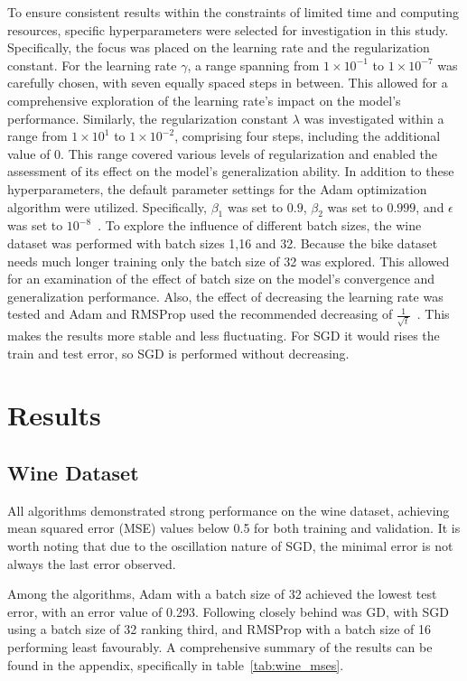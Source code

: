 \documentclass[10pt,conference,compsocconf]{IEEEtran}
\begin{document}
To ensure consistent results within the constraints of limited time and computing resources, specific hyperparameters were selected for investigation in this study. Specifically, the focus was placed on the learning rate and the regularization constant.
For the learning rate $\gamma$, a range spanning from $1 \times 10^{-1}$ to $1 \times 10^{-7}$ was carefully chosen, with seven equally spaced steps in between. This allowed for a comprehensive exploration of the learning rate's impact on the model's performance.
Similarly, the regularization constant $\lambda$ was investigated within a range from $1 \times 10^{1}$ to $1 \times 10^{-2}$, comprising four steps, including the additional value of $0$. This range covered various levels of regularization and enabled the assessment of its effect on the model's generalization ability.
In addition to these hyperparameters, the default parameter settings for the Adam optimization algorithm were utilized. Specifically, $\beta_1$ was set to $0.9$, $\beta_2$ was set to $0.999$, and $\epsilon$ was set to $10^{-8}$~\cite{kingma2017adam}.
To explore the influence of different batch sizes, the wine dataset was performed with batch sizes 1,16 and 32. 
Because the bike dataset needs much longer training only the batch size of 32 was explored.
This allowed for an examination of the effect of batch size on the model's convergence and generalization performance.
Also, the effect of decreasing the learning rate was tested and Adam and RMSProp used the recommended decreasing of $\frac{1}{\sqrt{t}}$~\cite{kingma2017adam}. 
This makes the results more stable and less fluctuating. 
For SGD it would rises the train and test error, so SGD is performed without decreasing.

\section{Results}
\subsection{Wine Dataset}


All algorithms demonstrated strong performance on the wine dataset, achieving mean squared error (MSE) values below 0.5 for both training and validation. 
It is worth noting that due to the oscillation nature of SGD, the minimal error is not always the last error observed.

Among the algorithms, Adam with a batch size of 32 achieved the lowest test error, with an error value of 0.293. 
Following closely behind was GD, with SGD using a batch size of 32 ranking third, and RMSProp with a batch size of 16 performing least favourably. 
A comprehensive summary of the results can be found in the appendix, specifically in table~\ref{tab:wine_mses}.
\end{document}
